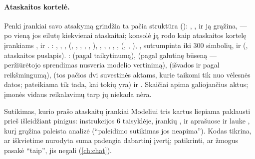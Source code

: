 \paragraph{Ataskaitos kortelė.} Penki įrankiai savo atsakymą grindžia ta pačia struktūra
(): , ,
 ir  ją grąžina,  --- po vieną jos eilutę
kiekvienai ataskaitai; konsolė ją rodo kaip ataskaitos kortelę įrankiams
,  ir . :
, , ,  (, ,
, , , ), ,
, , , , 
(, , ), , sutrumpinta iki 300 simbolių, ir
 (, ataskaitos puslapis). :  (pagal
taikytinumą),  (pagal galutinę būseną --- peržiūrėtojo sprendimas nusveria
modelio vertinimą),  (išvados  ir  pagal
reikšmingumą),  (tos pačios dvi suvestinės aktams, kurie taikomi tik nuo
vėlesnės datos; pateikiama tik tada, kai tokių yra) ir . Skaičiai apima
galiojančius aktus; įmonės vidaus reikalavimų tarp jų niekada nėra.

\begin{humanbox}{Sutikimas, kurio prašo ataskaitų įrankiai}
Modeliui tris kartus liepiama paklausti prieš išleidžiant pinigus: instrukcijos 6 taisyklėje,
įrankių ,  ir 
aprašuose ir lauke , kurį grąžina paleista analizė (\enquote{paleidimo sutikimas
jos neapima}). Kodas tikrina, ar iškvietime nurodyta suma padengia dabartinį įvertį; patikrinti,
ar žmogus pasakė \enquote{taip}, jis negali (\cref{ch:chat}).
\end{humanbox}

